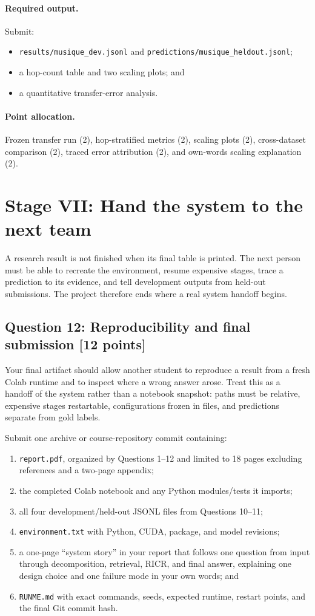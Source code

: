 \documentclass[11pt]{article}
\newcommand{\code}[1]{\texttt{#1}}
\newcommand{\RICR}{{\mdseries\textsc{RICR}}\xspace}
\newcommand{\question}[3]{%
  \subsection[Question #1: #2 (#3 points)]{Question #1: #2 \hfill [#3 points]}%
}
\newcommand{\deliverables}{\paragraph{Required output.}}
\newcommand{\grading}{\paragraph{Point allocation.}}
\begin{document}
\deliverables Submit:
\begin{itemize}
  \item \code{results/musique\_dev.jsonl} and
        \code{predictions/musique\_heldout.jsonl};
  \item a hop-count table and two scaling plots; and
  \item a quantitative transfer-error analysis.
\end{itemize}

\grading Frozen transfer run (2), hop-stratified metrics (2), scaling plots
(2), cross-dataset comparison (2), traced error attribution (2), and
own-words scaling explanation (2).

\section{Stage VII: Hand the system to the next team}

A research result is not finished when its final table is printed. The next
person must be able to recreate the environment, resume expensive stages,
trace a prediction to its evidence, and tell development outputs from held-out
submissions. The project therefore ends where a real system handoff begins.

\question{12}{Reproducibility and final submission}{12}

Your final artifact should allow another student to reproduce a result from a
fresh Colab runtime and to inspect where a wrong answer arose. Treat this as a
handoff of the system rather than a notebook snapshot: paths must be relative,
expensive stages restartable, configurations frozen in files, and predictions
separate from gold labels.

Submit one archive or course-repository commit containing:

\begin{enumerate}[label=(\alph*)]
  \item \code{report.pdf}, organized by Questions 1--12 and limited to 18 pages
        excluding references and a two-page appendix;
  \item the completed Colab notebook and any Python modules/tests it imports;
  \item all four development/held-out JSONL files from Questions 10--11;
  \item \code{environment.txt} with Python, CUDA, package, and model revisions;
  \item a one-page ``system story'' in your report that follows one question
        from input through decomposition, retrieval, \RICR, and final answer,
        explaining one design choice and one failure mode in your own words;
        and
  \item \code{RUNME.md} with exact commands, seeds, expected runtime, restart
        points, and the final Git commit hash.
\end{enumerate}
\end{document}
